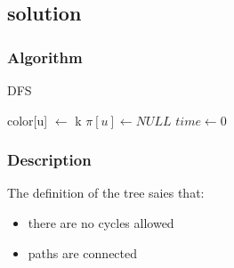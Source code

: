 \subsection{solution}

\subsubsection{Algorithm}
\begin{algorithm}[h]
\small
\caption{DFS}

\begin{algorithmic}
       \STATE color[u] $\gets$ k
       \STATE $\pi[u] \gets NULL$
    \ENDFOR
    \STATE $time \gets 0$
\end{algorithmic}
\end{algorithm}

% 


\subsubsection{Description}
The definition of the tree saies that:
\begin{itemize}
 \item there are no cycles allowed
 \item paths are connected
\end{itemize}
